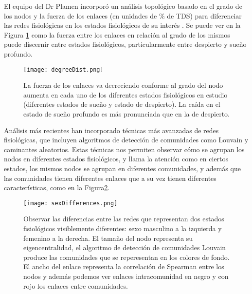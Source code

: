 \documentclass[twoside,twocolumn]{article}
\begin{document}
El equipo del Dr Plamen incorporó un análisis topológico basado en el grado de los nodos y la fuerza de los enlaces (en unidades de \% de TDS) para diferenciar las redes fisiológicas en los estados fisiológicos de su interés \cite{bashan2012network}\cite{2015Plasticity}.
Se puede ver en la Figura \ref{fig:degreeDist} como la fuerza entre los enlaces en relación al grado de los mismos puede discernir entre estados fisiológicos, particularmente entre despierto y sueño profundo.

\begin{figure}[H]
  \texttt{[image: degreeDist.png]}
  \caption{La fuerza de los enlaces va decreciendo conforme al grado del nodo aumenta en cada uno de los diferentes estados fisiológicos en estudio (diferentes estados de sueño y estado de despierto). La caída en el estado de sueño profundo es más pronunciada que en la de despierto.}
  \label{fig:degreeDist}
\end{figure}

Análisis más recientes han incorporado técnicas más avanzadas de redes fisiológicas, que incluyen algoritmos de detección de comunidades como Louvain y caminantes aleatorios\cite{barajas2021sex}\cite{barajas2021physiological}\cite{easton2020metabolic}\cite{chmiel2014spreading}.
Estas técnicas nos permiten observar cómo se agrupan los nodos en diferentes estados fisiológicos, y llama la atención como en ciertos estados, los mismos nodos se agrupan en diferentes comunidades, y además que las comunidades tienen diferentes enlaces que a su vez tienen diferentes características, como en la Figura\ref{fig:sexDifferences}.

\begin{figure}
  \texttt{[image: sexDifferences.png]}
  \caption{Observar las diferencias entre las redes que representan dos estados fisiológicos visiblemente diferentes: sexo masculino a la izquierda y femenino a la derecha. El tamaño del nodo representa su eigencentralidad, el algoritmo de detección de comunidades Louvain produce las comunidades que se reperesentan en los colores de fondo. El ancho del enlace representa la correlación de Spearman entre los nodos y además podemos ver enlaces intracomunidad en negro y con rojo los enlaces entre comunidades.}
  \label{fig:sexDifferences}
\end{figure}
\end{document}
